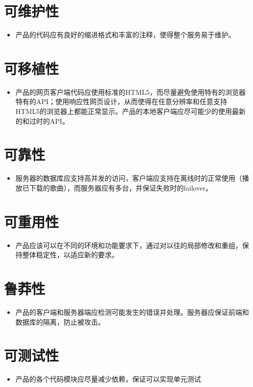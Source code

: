 \section {可维护性}
\begin{itemize}
	\item 产品的代码应有良好的缩进格式和丰富的注释，使得整个服务易于维护。
\end{itemize}

\section {可移植性}
\begin{itemize}
	\item 产品的网页客户端代码应使用标准的HTML5，而尽量避免使用特有的浏览器特有的API；使用响应性网页设计，从而使得在任意分辨率和任意支持HTML5的浏览器上都能正常显示。产品的本地客户端应尽可能少的使用最新的和过时的API。
\end{itemize}

\section {可靠性}
\begin{itemize}
	\item 服务器的数据库应支持高并发的访问，客户端应支持在离线时的正常使用（播放已下载的歌曲），而服务器应有多台，并保证失败时的failover。
\end{itemize}

\section {可重用性}
\begin{itemize}
	\item 产品应该可以在不同的环境和功能要求下，通过对以往的局部修改和重组，保持整体稳定性，以适应新的要求。
\end{itemize}

\section {鲁莽性}
\begin{itemize}
	\item 产品的客户端和服务器端应检测可能发生的错误并处理。服务器应保证前端和数据库的隔离，防止被攻击。
\end{itemize}

\section {可测试性}
\begin{itemize}
	\item 产品的各个代码模块应尽量减少依赖，保证可以实现单元测试
\end{itemize}